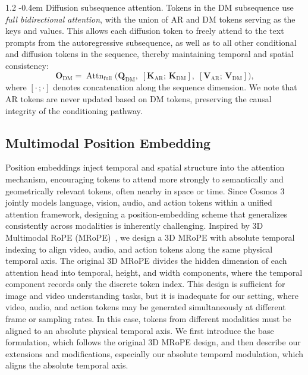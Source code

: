 \documentclass{llmxive}
\makeatletter
\providecommand{\paragraph}{  \@startsection{paragraph}{4}{\z@}    {1\baselineskip \@plus .2\baselineskip}    {-0.4em}    {\normalfont\normalsize\bfseries}}
\makeatother
\begin{document}
\paragraph{Diffusion subsequence attention.}
Tokens in the DM subsequence use \emph{full bidirectional attention}, with the union of AR and DM tokens serving as the keys and values. This allows each diffusion token to freely attend to the text prompts from the autoregressive subsequence, as well as to all other conditional and diffusion tokens in the sequence, thereby maintaining temporal and spatial consistency:
\begin{equation}
    \mathbf{O}_\text{DM} = \operatorname{Attn}_\text{full}\!\bigl(
        \mathbf{Q}_\text{DM},\;
        [\mathbf{K}_\text{AR};\,\mathbf{K}_\text{DM}],\;
        [\mathbf{V}_\text{AR};\,\mathbf{V}_\text{DM}]
    \bigr),
    \label{eq::df_attn}
\end{equation}
where $[\cdot \,; \cdot]$ denotes concatenation along the sequence dimension. We note that AR tokens are never updated based on DM tokens, preserving the causal integrity of the conditioning pathway.

\subsection{Multimodal Position Embedding}
Position embeddings inject temporal and spatial structure into the attention mechanism, encouraging tokens to attend more strongly to semantically and geometrically relevant tokens, often nearby in space or time. Since Cosmos 3 jointly models language, vision, audio, and action tokens within a unified attention framework, designing a position-embedding scheme that generalizes consistently across modalities is inherently challenging. Inspired by 3D Multimodal RoPE (MRoPE)~\citep{bai2025qwen3}, we design a 3D MRoPE with absolute temporal indexing to align video, audio, and action tokens along the same physical temporal axis. The original 3D MRoPE divides the hidden dimension of each attention head into temporal, height, and width components, where the temporal component records only the discrete token index. This design is sufficient for image and video understanding tasks, but it is inadequate for our setting, where video, audio, and action tokens may be generated simultaneously at different frame or sampling rates. In this case, tokens from different modalities must be aligned to an absolute physical temporal axis. We first introduce the base formulation, which follows the original 3D MRoPE design, and then describe our extensions and modifications, especially our absolute temporal modulation, which aligns the absolute temporal axis.
\end{document}
